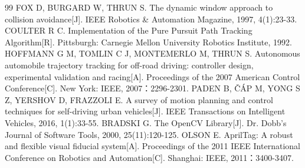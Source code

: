 \begin{thebibliography}{99}
 FOX D, BURGARD W, THRUN S. The dynamic window approach to collision avoidance{[}J{]}. IEEE Robotics \& Automation Magazine, 1997, 4(1):23-33.
 COULTER R C. Implementation of the Pure Pursuit Path Tracking Algorithm{[}R{]}. Pittsburgh: Carnegie Mellon University Robotics Institute, 1992.
 HOFFMANN G M, TOMLIN C J, MONTEMERLO M, THRUN S. Autonomous automobile trajectory tracking for off-road driving: controller design, experimental validation and racing{[}A{]}. Proceedings of the 2007 American Control Conference{[}C{]}. New York: IEEE, 2007：2296-2301.
 PADEN B, ČÁP M, YONG S Z, YERSHOV D, FRAZZOLI E. A survey of motion planning and control techniques for self-driving urban vehicles{[}J{]}. IEEE Transactions on Intelligent Vehicles, 2016, 1(1):33-55.
 BRADSKI G. The OpenCV Library{[}J{]}. Dr. Dobb's Journal of Software Tools, 2000, 25(11):120-125.
 OLSON E. AprilTag: A robust and flexible visual fiducial system{[}A{]}. Proceedings of the 2011 IEEE International Conference on Robotics and Automation{[}C{]}. Shanghai: IEEE, 2011：3400-3407.
\end{thebibliography}
